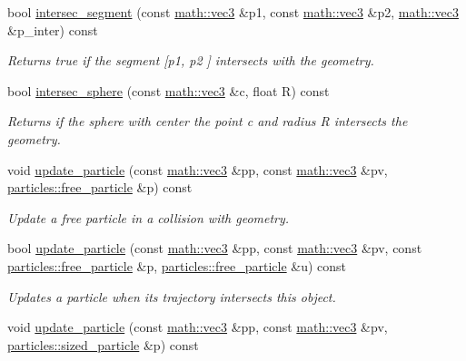 \begin{DoxyCompactItemize}
bool \hyperlink{classphysim_1_1geometric_1_1object_a10ee0f5a42edf3c469a9354a11571aac}{intersec\+\_\+segment} (const \hyperlink{structphysim_1_1math_1_1vec3}{math\+::vec3} \&p1, const \hyperlink{structphysim_1_1math_1_1vec3}{math\+::vec3} \&p2, \hyperlink{structphysim_1_1math_1_1vec3}{math\+::vec3} \&p\+\_\+inter) const
\begin{DoxyCompactList}\small\item\em Returns true if the segment \mbox{[}{\itshape p1}, {\itshape p2} \mbox{]} intersects with the geometry. \end{DoxyCompactList}\item 
bool \hyperlink{classphysim_1_1geometric_1_1object_a2846f76ef5b800bc50b6fa7e0a478a80}{intersec\+\_\+sphere} (const \hyperlink{structphysim_1_1math_1_1vec3}{math\+::vec3} \&c, float R) const
\begin{DoxyCompactList}\small\item\em Returns if the sphere with center the point {\itshape c} and radius {\itshape R} intersects the geometry. \end{DoxyCompactList}\item 
void \hyperlink{classphysim_1_1geometric_1_1object_a9885341b8bad60413402d84249bea9a2}{update\+\_\+particle} (const \hyperlink{structphysim_1_1math_1_1vec3}{math\+::vec3} \&pp, const \hyperlink{structphysim_1_1math_1_1vec3}{math\+::vec3} \&pv, \hyperlink{classphysim_1_1particles_1_1free__particle}{particles\+::free\+\_\+particle} \&p) const
\begin{DoxyCompactList}\small\item\em Update a free particle in a collision with geometry. \end{DoxyCompactList}\item 
bool \hyperlink{classphysim_1_1geometric_1_1object_a1d9063dda2c637490c15fddc8f0281cf}{update\+\_\+particle} (const \hyperlink{structphysim_1_1math_1_1vec3}{math\+::vec3} \&pp, const \hyperlink{structphysim_1_1math_1_1vec3}{math\+::vec3} \&pv, const \hyperlink{classphysim_1_1particles_1_1free__particle}{particles\+::free\+\_\+particle} \&p, \hyperlink{classphysim_1_1particles_1_1free__particle}{particles\+::free\+\_\+particle} \&u) const
\begin{DoxyCompactList}\small\item\em Updates a particle when its trajectory intersects this object. \end{DoxyCompactList}\item 
void \hyperlink{classphysim_1_1geometric_1_1object_aa9f27d1cc4ee3a3b9883bd155435c2bc}{update\+\_\+particle} (const \hyperlink{structphysim_1_1math_1_1vec3}{math\+::vec3} \&pp, const \hyperlink{structphysim_1_1math_1_1vec3}{math\+::vec3} \&pv, \hyperlink{classphysim_1_1particles_1_1sized__particle}{particles\+::sized\+\_\+particle} \&p) const

\end{DoxyCompactItemize}
